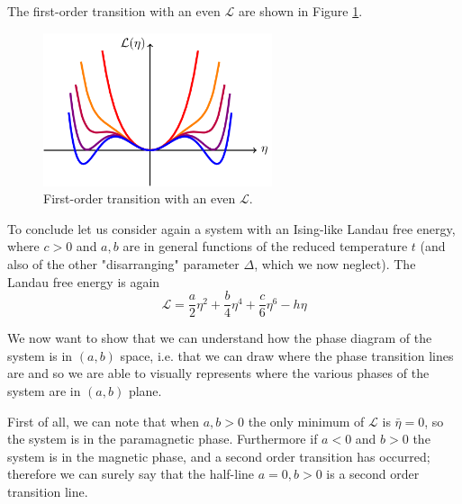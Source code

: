\documentclass[../main/main.tex]{subfiles}
\begin{document}
\noindent The first-order transition with an even \( \mathcal{L} \) are shown in Figure \ref{fig:16_f}.

\begin{figure}[h!]
\centering
\includegraphics[width=0.6\textwidth]{../lessons/16_image/f.png}
\caption{\label{fig:16_f} First-order transition with an even \( \mathcal{L} \).}
\end{figure}


To conclude let us consider again a system with an Ising-like Landau free energy, where \( c>0 \) and  \( a,b \)  are in general functions of the reduced temperature \( t \)  (and also of the other "disarranging" parameter \( \Delta  \), which we now neglect). The Landau free energy is again
\begin{equation*}
  \mathcal{L}  = \frac{a }{2} \eta ^2 + \frac{b}{4} \eta ^4 + \frac{c}{6} \eta ^6 - h \eta
\end{equation*}

 We now want to show that we can understand how the phase diagram of the system is in  \( (a,b) \) space, i.e. that we can draw where the phase transition lines are and so we are able to visually represents where the various phases of the system are in \( (a,b) \) plane.

 First of all, we can note that when \( a,b>0 \) the only minimum of \( \mathcal{L} \)  is  \( \bar{\eta }=0  \), so the system is in the paramagnetic phase. Furthermore if \( a<0 \)  and  \( b>0 \) the system is in the magnetic phase, and a second order transition has occurred; therefore we can surely say that the half-line  \( a=0,b>0 \) is a second order transition line.
\end{document}
